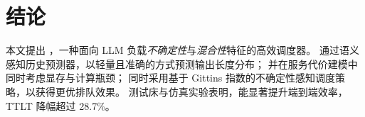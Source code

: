 \section{结论}
\label{sec:conclusion}

本文提出 \oursched，一种面向 LLM 负载\emph{不确定性}与\emph{混合性}特征的高效调度器。
\oursched 通过语义感知历史预测器，以轻量且准确的方式预测输出长度分布；
并在服务代价建模中同时考虑显存与计算瓶颈；
同时采用基于 Gittins 指数的不确定性感知调度策略，以获得更优排队效果。
测试床与仿真实验表明，\oursched 能显著提升端到端效率，TTLT 降幅超过 28.7\%。
